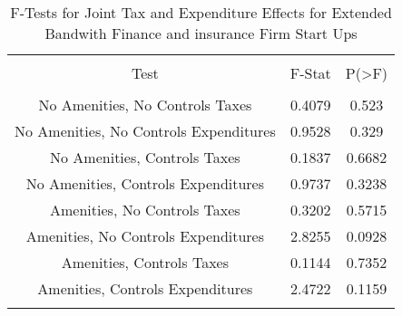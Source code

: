 
\begin{table}[!htbp] \centering 
  \caption{F-Tests for Joint Tax and Expenditure Effects for Extended Bandwith Finance and insurance Firm Start Ups} 
  \label{52Ftests} 
\begin{tabular}{@{\extracolsep{5pt}} ccc} 
\\[-1.8ex]\hline 
\hline \\[-1.8ex] 
Test & F-Stat & P(\textgreater F) \\ 
\hline \\[-1.8ex] 
No Amenities, No Controls Taxes & 0.4079 & 0.523 \\ 
No Amenities, No Controls Expenditures & 0.9528 & 0.329 \\ 
No Amenities, Controls Taxes & 0.1837 & 0.6682 \\ 
No Amenities, Controls Expenditures & 0.9737 & 0.3238 \\ 
Amenities, No Controls Taxes & 0.3202 & 0.5715 \\ 
Amenities, No Controls Expenditures & 2.8255 & 0.0928 \\ 
Amenities, Controls Taxes & 0.1144 & 0.7352 \\ 
Amenities, Controls Expenditures & 2.4722 & 0.1159 \\ 
\hline \\[-1.8ex] 
\end{tabular} 
\end{table} 

